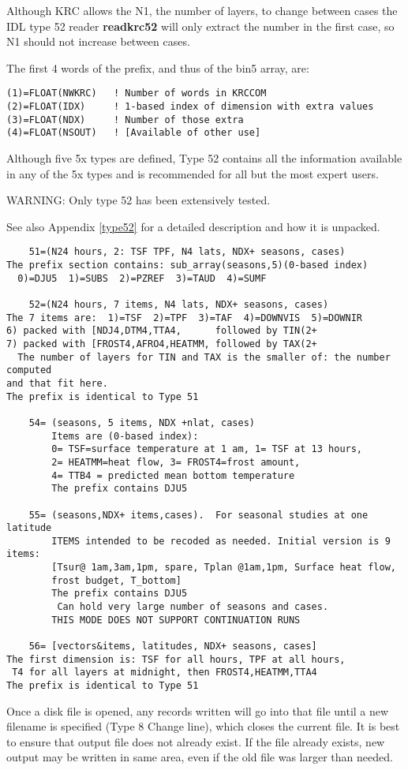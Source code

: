 \documentclass[draft]{article}  %
\newcommand{\np}{\textbf}  %
\begin{document}
Although KRC allows the N1, the number of layers, to change between cases the
IDL type 52 reader \np{readkrc52} will only extract the number in the first
case, so N1 should not increase between cases.

The first 4 words of the prefix, and thus of the bin5 array, are:
\vspace{-3.mm} 
\begin{verbatim}
(1)=FLOAT(NWKRC)   ! Number of words in KRCCOM
(2)=FLOAT(IDX)     ! 1-based index of dimension with extra values
(3)=FLOAT(NDX)     ! Number of those extra
(4)=FLOAT(NSOUT)   ! [Available of other use]
\end{verbatim} 

Although five 5x types are defined, Type 52 contains all the information available in any of the 5x types and is recommended for all but the most expert users.  

WARNING: Only type 52 has been extensively tested.

See also Appendix \ref{type52} for a detailed description and how it is unpacked.

\vspace{-3.mm}
\begin{verbatim}
    51=(N24 hours, 2: TSF TPF, N4 lats, NDX+ seasons, cases)
The prefix section contains: sub_array(seasons,5)(0-based index)
  0)=DJU5  1)=SUBS  2)=PZREF  3)=TAUD  4)=SUMF

    52=(N24 hours, 7 items, N4 lats, NDX+ seasons, cases)
The 7 items are:  1)=TSF  2)=TPF  3)=TAF  4)=DOWNVIS  5)=DOWNIR
6) packed with [NDJ4,DTM4,TTA4,      followed by TIN(2+
7) packed with [FROST4,AFRO4,HEATMM, followed by TAX(2+
  The number of layers for TIN and TAX is the smaller of: the number computed 
and that fit here.
The prefix is identical to Type 51

    54= (seasons, 5 items, NDX +nlat, cases)
        Items are (0-based index): 
        0= TSF=surface temperature at 1 am, 1= TSF at 13 hours,
        2= HEATMM=heat flow, 3= FROST4=frost amount, 
        4= TTB4 = predicted mean bottom temperature
        The prefix contains DJU5 

    55= (seasons,NDX+ items,cases).  For seasonal studies at one latitude
        ITEMS intended to be recoded as needed. Initial version is 9 items:
        [Tsur@ 1am,3am,1pm, spare, Tplan @1am,1pm, Surface heat flow,
        frost budget, T_bottom]
        The prefix contains DJU5        
         Can hold very large number of seasons and cases. 
        THIS MODE DOES NOT SUPPORT CONTINUATION RUNS

    56= [vectors&items, latitudes, NDX+ seasons, cases]
The first dimension is: TSF for all hours, TPF at all hours, 
 T4 for all layers at midnight, then FROST4,HEATMM,TTA4
The prefix is identical to Type 51
\end{verbatim}
Once a disk file is opened, any records written will go into that file until a
new filename is specified (Type 8 Change line), which closes the current file.
It is best to ensure that output file does not already exist. If the file
already exists, new output may be written in same area, even if the old file was
larger than needed.
\end{document}
